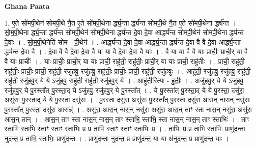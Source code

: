 \documentclass[17pt]{extarticle}
\begin{document}
\textbf{Ghana Paata } \newline

1. ए॒ते सो॑मपी॒थेन॑ सोमपी॒थे नै॒त ए॒ते सो॑मपी॒थेना र्द्ध्य॒न्ता र्द्ध्य॑न्त सोमपी॒थे नै॒त ए॒ते सो॑मपी॒थेना र्द्ध्य॑न्त । . सो॒म॒पी॒थेना र्द्ध्य॒न्ता र्द्ध्य॑न्त सोमपी॒थेन॑ सोमपी॒थेना र्द्ध्य॑न्त दे॒वा दे॒वा आर्द्ध्य॑न्त सोमपी॒थेन॑ सोमपी॒थेना र्द्ध्य॑न्त दे॒वाः । . सो॒म॒पी॒थेनेति॑ सोम - पी॒थेन॑ । . आर्द्ध्य॑न्त दे॒वा दे॒वा आर्द्ध्य॒न्ता र्द्ध्य॑न्त दे॒वा वै वै दे॒वा आर्द्ध्य॒न्ता र्द्ध्य॑न्त दे॒वा वै । . दे॒वा वै वै दे॒वा दे॒वा वै या या वै दे॒वा दे॒वा वै याः । . वै या या वै वै याः प्राचीः॒ प्राची॒र् या वै वै याः प्राचीः᳚ । . याः प्राचीः॒ प्राची॒र् या याः प्राची॒ राहु॑ती॒ राहु॑तीः॒ प्राची॒र् या याः प्राची॒ राहु॑तीः । . प्राची॒ राहु॑ती॒ राहु॑तीः॒ प्राचीः॒ प्राची॒ राहु॑ती॒ रजु॑हवु॒ रजु॑हवु॒ राहु॑तीः॒ प्राचीः॒ प्राची॒ राहु॑ती॒ रजु॑हवुः । . आहु॑ती॒ रजु॑हवु॒ रजु॑हवु॒ राहु॑ती॒ राहु॑ती॒ रजु॑हवु॒र् ये ये ऽजु॑हवु॒ राहु॑ती॒ राहु॑ती॒ रजु॑हवु॒र् ये । . आहु॑ती॒रित्या - हु॒तीः॒ । . अजु॑हवु॒र् ये ये ऽजु॑हवु॒ रजु॑हवु॒र् ये पु॒रस्ता᳚त् पु॒रस्ता॒द् ये ऽजु॑हवु॒ रजु॑हवु॒र् ये पु॒रस्ता᳚त् । . ये पु॒रस्ता᳚त् पु॒रस्ता॒द् ये ये पु॒रस्ता॒ दसु॑रा॒ असु॑राः पु॒रस्ता॒द् ये ये पु॒रस्ता॒ दसु॑राः । . पु॒रस्ता॒ दसु॑रा॒ असु॑राः पु॒रस्ता᳚त् पु॒रस्ता॒ दसु॑रा॒ आस॒न् नास॒न् नसु॑राः पु॒रस्ता᳚त् पु॒रस्ता॒ दसु॑रा॒ आसन्न्॑ । . असु॑रा॒ आस॒न् नास॒न् नसु॑रा॒ असु॑रा॒ आस॒न् ताꣳ स्ता नास॒न् नसु॑रा॒ असु॑रा॒ आस॒न् तान् । . आस॒न् ताꣳ स्ता नास॒न् नास॒न् ताꣳ स्ताभि॒ स्ताभि॒ स्ता नास॒न् नास॒न् ताꣳ स्ताभिः॑ । . ताꣳ स्ताभि॒ स्ताभि॒ स्ताꣳ स्ताꣳ स्ताभिः॒ प्र प्र ताभि॒ स्ताꣳ स्ताꣳ स्ताभिः॒ प्र । . ताभिः॒ प्र प्र ताभि॒ स्ताभिः॒ प्राणु॑दन्ता नुदन्त॒ प्र ताभि॒ स्ताभिः॒ प्राणु॑दन्त । . प्राणु॑दन्ता नुदन्त॒ प्र प्राणु॑दन्त॒ या या अ॑नुदन्त॒ प्र प्राणु॑दन्त॒ याः । \newline
\end{document}
